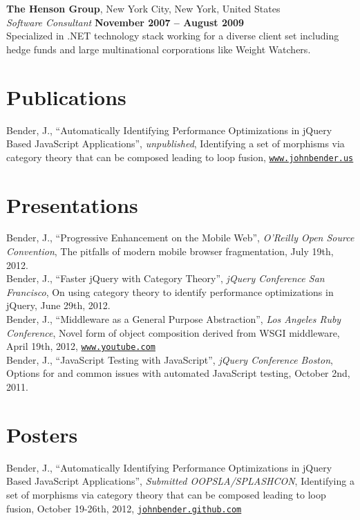 \documentclass[margin,line]{resume}
\begin{document}
\begin{resume}
  \textbf{The Henson Group}, New York City, New York, United States \vspace{1mm}\\
  \textsl{Software Consultant} \hfill \textbf{November 2007 -- August 2009}\\
  Specialized in .NET technology stack working for a diverse client set including hedge funds and large multinational corporations like Weight Watchers.

  \section{\mysidestyle Publications}
  Bender, J., ``Automatically Identifying Performance Optimizations in jQuery Based JavaScript Applications'', \textsl{unpublished}, Identifying a set of morphisms via category theory that can be composed leading to loop fusion, \href{http://johnbender.us/auto-js.pdf}{\texttt{www.johnbender.us}}

  \section{\mysidestyle Presentations}
  Bender, J., ``Progressive Enhancement on the Mobile Web'', \textsl{O'Reilly Open Source Convention}, The pitfalls of modern mobile browser fragmentation, July 19th, 2012.\vspace{2mm}\\
  Bender, J., ``Faster jQuery with Category Theory'', \textsl{jQuery Conference San Francisco}, On using category theory to identify performance optimizations in jQuery, June 29th, 2012. \vspace{2mm}\\
  Bender, J., ``Middleware as a General Purpose Abstraction'', \textsl{Los Angeles Ruby Conference}, Novel form of object composition derived from WSGI middleware, April 19th, 2012, \href{http://www.youtube.com/watch?feature=player_embedded&v=fcNaiP5tea0}{\texttt{www.youtube.com}}\ \vspace{2mm}\\
  Bender, J., ``JavaScript Testing with JavaScript'', \textsl{jQuery Conference Boston}, Options for and common issues with automated JavaScript testing, October 2nd, 2011.

  \section{\mysidestyle Posters}
  Bender, J., ``Automatically Identifying Performance Optimizations in jQuery Based JavaScript Applications'', \textsl{Submitted OOPSLA/SPLASHCON}, Identifying a set of morphisms via category theory that can be composed leading to loop fusion, October 19-26th, 2012, \href{http://johnbender.github.com/auto-jquery-optimization-paper/}{\texttt{johnbender.github.com}}\



\end{resume}
\end{document}
